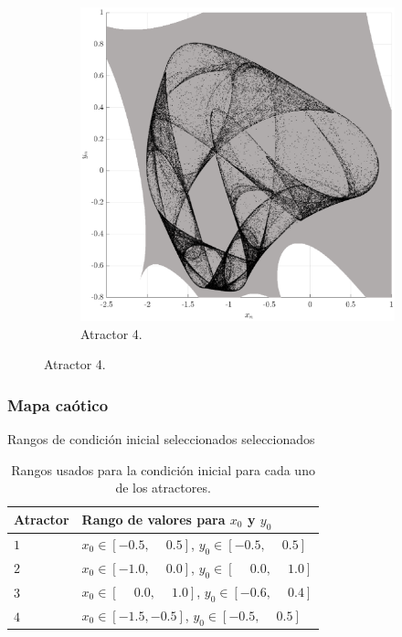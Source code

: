 \documentclass[10pt]{beamer}
\begin{document}
\begin{frame}
\begin{figure}[hbtp]
\begin{subfigure}[b]{0.475\textwidth}
                \includegraphics[width=\textwidth,trim=70 0 70 0,clip]{H4_map4}
                \caption{Atractor 4.}    
                \label{fig:mapa_h4}
            \end{subfigure}
        \end{figure}
\end{frame}



\begin{frame}
    \frametitle{Mapa caótico}
    \begin{block}{Rangos de condición inicial seleccionados seleccionados}
        \justifying
        \begin{table}[htbp]
            \centering
            \caption{Rangos usados para la condición inicial para cada uno de los atractores.}
            \begin{tabular}{|l|l|}
                \hline
                \rowcolor{lightgray} Atractor  & Rango de valores para $x_{0}$ y $y_{0}$ \\
                \hline
                $1$  & $x_{0} \in [-0.5, \phantom{-} 0.5]$, $y_{0} \in [-0.5, \phantom{-}0.5]$ \\
                \hline
                $2$  & $x_{0} \in [-1.0, \phantom{-} 0.0]$, $y_{0} \in [\phantom{-}0.0, \phantom{-}1.0]$ \\
                \hline
                $3$  & $x_{0} \in [\phantom{-}0.0, \phantom{-} 1.0]$, $y_{0} \in [-0.6, \phantom{-}0.4]$ \\
                \hline
                $4$  & $x_{0} \in [-1.5, -0.5]$, $y_{0} \in [-0.5, \phantom{-}0.5]$ \\
                \hline
            \end{tabular}
            \label{tab:rangos_mapas}
        \end{table} 
        \end{block}
\end{frame}
\end{document}
